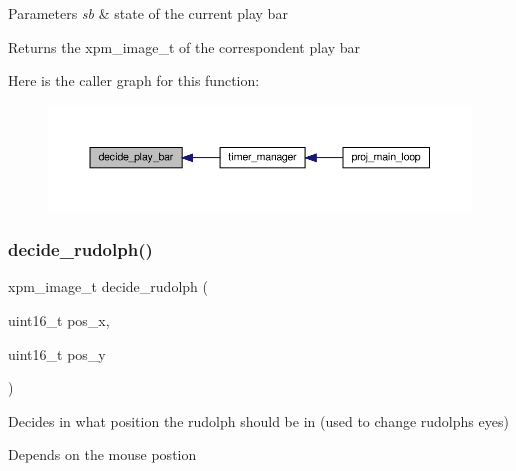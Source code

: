 \begin{DoxyParams}{Parameters}
{\em sb} & state of the current play bar\\
\hline
\end{DoxyParams}
\begin{DoxyReturn}{Returns}
the xpm\+\_\+image\+\_\+t of the correspondent play bar 
\end{DoxyReturn}
Here is the caller graph for this function\+:
\nopagebreak
\begin{figure}[H]
\begin{center}
\leavevmode
\includegraphics[width=350pt]{group__loading__xpms_gad678e45b98e3cc05dca5b24dad2be564_icgraph}
\end{center}
\end{figure}
\mbox{\label{group__loading__xpms_gada234fac1a8886b19a988eb80e99ef15}} 
\subsubsection{\texorpdfstring{decide\+\_\+rudolph()}{decide\_rudolph()}}
{\footnotesize\ttfamily xpm\+\_\+image\+\_\+t decide\+\_\+rudolph (\begin{DoxyParamCaption}\item[{uint16\+\_\+t}]{pos\+\_\+x,  }\item[{uint16\+\_\+t}]{pos\+\_\+y }\end{DoxyParamCaption})}



Decides in what position the rudolph should be in (used to change rudolph\textquotesingle{}s eyes) 

Depends on the mouse postion


